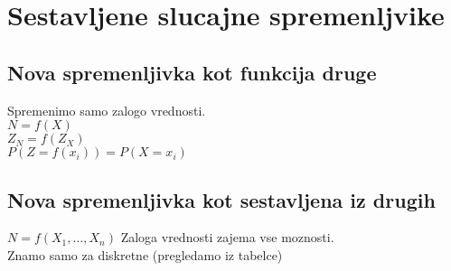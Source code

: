 \section{Sestavljene slucajne spremenljvike}
\subsection{Nova spremenljivka kot funkcija druge}
Spremenimo samo zalogo vrednosti.\\
$N=f(X)$\\
$Z_N = f(Z_X)$\\
$P(Z=f(x_i))=P(X=x_i)$\\


\subsection{Nova spremenljivka kot sestavljena iz drugih}
$N=f(X_1,\dots,X_n)$
Zaloga vrednosti zajema vse moznosti.\\
Znamo samo za diskretne (pregledamo iz tabelce)\\